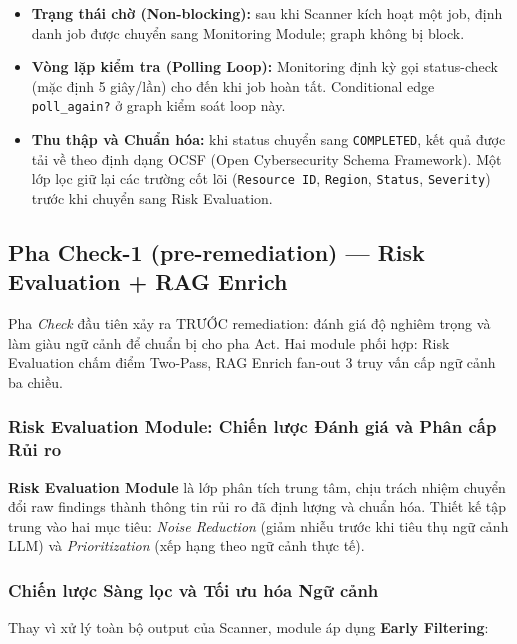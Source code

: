 \begin{itemize}
  \item \textbf{Trạng thái chờ (Non-blocking):} sau khi Scanner kích hoạt một job, định danh job được chuyển sang Monitoring Module; graph không bị block.
  \item \textbf{Vòng lặp kiểm tra (Polling Loop):} Monitoring định kỳ gọi status-check (mặc định 5 giây/lần) cho đến khi job hoàn tất. Conditional edge \texttt{poll\_again?} ở graph kiểm soát loop này.
  \item \textbf{Thu thập và Chuẩn hóa:} khi status chuyển sang \texttt{COMPLETED}, kết quả được tải về theo định dạng OCSF (Open Cybersecurity Schema Framework). Một lớp lọc giữ lại các trường cốt lõi (\texttt{Resource ID}, \texttt{Region}, \texttt{Status}, \texttt{Severity}) trước khi chuyển sang Risk Evaluation.
\end{itemize}
\subsection{Pha Check-1 (pre-remediation) --- Risk Evaluation + RAG Enrich}
\label{sec:phase_check1}

Pha \textit{Check} đầu tiên xảy ra TRƯỚC remediation: đánh giá độ nghiêm trọng và làm giàu ngữ cảnh để chuẩn bị cho pha Act. Hai module phối hợp: Risk Evaluation chấm điểm Two-Pass, RAG Enrich fan-out 3 truy vấn cấp ngữ cảnh ba chiều.

\subsubsection*{Risk Evaluation Module: Chiến lược Đánh giá và Phân cấp Rủi ro}
\label{subsec:risk_evaluation_module}

\textbf{Risk Evaluation Module} là lớp phân tích trung tâm, chịu trách nhiệm chuyển đổi raw findings thành thông tin rủi ro đã định lượng và chuẩn hóa. Thiết kế tập trung vào hai mục tiêu: \textit{Noise Reduction} (giảm nhiễu trước khi tiêu thụ ngữ cảnh LLM) và \textit{Prioritization} (xếp hạng theo ngữ cảnh thực tế).

\subsubsection*{Chiến lược Sàng lọc và Tối ưu hóa Ngữ cảnh}

Thay vì xử lý toàn bộ output của Scanner, module áp dụng \textbf{Early Filtering}:

